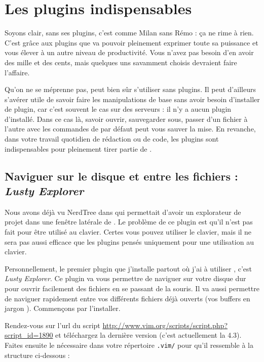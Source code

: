 \chapter{Les plugins indispensables}
\label{plugins}

Soyons clair, \vim sans ses plugins, c'est comme Milan sans Rémo : ça ne rime à rien. C'est grâce aux plugins que \vim va pouvoir pleinement exprimer toute sa puissance et vous élever à un autre niveau de productivité. Vous n'avez pas besoin d'en avoir des mille et des cents, mais quelques uns savamment choisis devraient faire l'affaire.

Qu'on ne se méprenne pas, \vim peut bien sûr s'utiliser sans plugins. Il peut d'ailleurs s'avérer utile de savoir faire les manipulations de base sans avoir besoin d'installer de plugin, car c'est souvent le cas sur des serveurs : il n'y a aucun plugin d'installé. Dans ce cas là, savoir ouvrir, sauvegarder sous, passer d'un fichier à l'autre avec les commandes de \vim par défaut peut vous sauver la mise. En revanche, dans votre travail quotidien de rédaction ou de code, les plugins sont indispensables pour pleinement tirer partie de \vim.

\section{Naviguer sur le disque et entre les fichiers : \emph{Lusty Explorer}}\label{lusty}

Nous avons déjà vu NerdTree dans  qui permettait d'avoir un explorateur de projet dans une fenêtre latérale de \vim. Le problème de ce plugin est qu'il n'est pas fait pour être utilisé au clavier. Certes vous pouvez utiliser le clavier, mais il ne sera pas aussi efficace que les plugins pensés uniquement pour une utilisation au clavier.

Personnellement, le premier plugin que j'installe partout où j'ai à utiliser \vim, c'est \emph{Lusty Explorer}. Ce plugin va vous permettre de naviguer sur votre disque dur pour ouvrir facilement des fichiers en se passant de la souris. Il va aussi permettre de naviguer rapidement entre vos différents fichiers déjà ouverts (vos buffers en jargon \vim). Commençons par l'installer.

Rendez-vous sur l'url du script \url{http://www.vim.org/scripts/script.php?script\_id=1890} et téléchargez la dernière version (c'est actuellement la 4.3). Faites ensuite le nécessaire dans votre répertoire \Verb|.vim/| pour qu'il ressemble à la structure ci-dessous :

